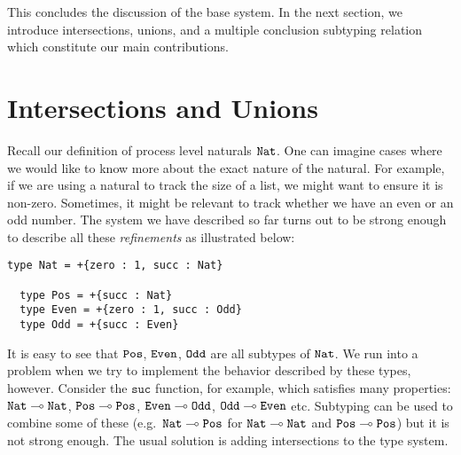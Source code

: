 \documentclass[a4paper,USenglish]{lipics-v2016}
\begin{document}

This concludes the discussion of the base system. In the next section, we introduce intersections, unions, and a multiple conclusion subtyping relation which constitute our main contributions.


\section{Intersections and Unions}
\label{refinements}

Recall our definition of process level naturals $\mathtt{Nat}$. One can imagine cases where we would like to know more about the exact nature of the natural. For example, if we are using a natural to track the size of a list, we might want to ensure it is non-zero. Sometimes, it might be relevant to track whether we have an even or an odd number. The system we have described so far turns out to be strong enough to describe all these \emph{refinements} as illustrated below:

\begin{lstlisting}[language=krill, style=custom]
  type Nat = +{zero : 1, succ : Nat}

  type Pos = +{succ : Nat}
  type Even = +{zero : 1, succ : Odd}
  type Odd = +{succ : Even}
\end{lstlisting}

It is easy to see that $\mathtt{Pos}$, $\mathtt{Even}$, $\mathtt{Odd}$ are all subtypes of $\mathtt{Nat}$. We run into a problem when we try to implement the behavior described by these types, however. Consider the $\mathtt{suc}$ function, for example, which satisfies many properties: $\mathtt{Nat} \multimap \mathtt{Nat}$, $\mathtt{Pos} \multimap \mathtt{Pos}$, $\mathtt{Even} \multimap \mathtt{Odd}$, $\mathtt{Odd} \multimap \mathtt{Even}$ etc. Subtyping can be used to combine some of these (e.g.\ $\mathtt{Nat} \multimap \mathtt{Pos}$ for $\mathtt{Nat} \multimap \mathtt{Nat}$ and $\mathtt{Pos} \multimap \mathtt{Pos}$) but it is not strong enough. The usual solution is adding intersections to the type system.
\end{document}
